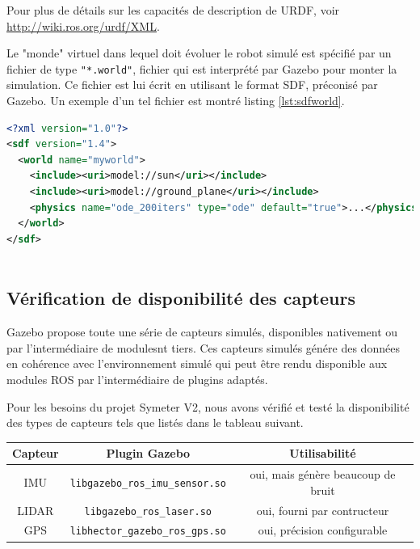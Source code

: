 \documentclass[12pt,a4paper]{report}
\begin{document}
		\para Pour plus de détails sur les capacités de description de URDF, voir  \href{http://wiki.ros.org/urdf/XML}{http://wiki.ros.org/urdf/XML}.
		
		\para Le "monde" virtuel dans lequel doit évoluer le robot simulé est spécifié par un fichier de type \verb|"*.world"|, fichier qui est interprété par Gazebo pour monter la simulation. Ce fichier est lui écrit en utilisant le format SDF, préconisé par Gazebo. Un exemple d'un tel fichier est montré listing \ref{lst:sdfworld}. 
		
		\begin{lstlisting}[caption={Exemple d'un fichier "*.world"},label={lst:sdfworld},language=XML,captionpos=b,basicstyle=\footnotesize]
<?xml version="1.0"?>
<sdf version="1.4">
  <world name="myworld">
    <include><uri>model://sun</uri></include>		
    <include><uri>model://ground_plane</uri></include>		
    <physics name="ode_200iters" type="ode" default="true">...</physics>
  </world>
</sdf>
		
		\end{lstlisting}
		
		
		
		
		\subsection{Vérification de disponibilité des capteurs}
		
		Gazebo propose toute une série de capteurs simulés, disponibles nativement ou par l'intermédiaire de modulesnt tiers. Ces capteurs simulés génére des données en cohérence avec l'environnement simulé qui peut être rendu disponible aux modules ROS par l'intermédiaire de plugins adaptés.
		
		\para Pour les besoins du projet Symeter V2, nous avons vérifié et testé la disponibilité des types de capteurs tels que listés dans le tableau suivant.
		\newline
		
		\begin{center}
			
		\begin{tabular}{|c|c|c|}
			\hline 
			Capteur & Plugin Gazebo & Utilisabilité \\ 
			\hline 
			IMU & \verb|libgazebo_ros_imu_sensor.so| &  oui, mais génère beaucoup de bruit\\ 
			\hline 
			LIDAR & \verb|libgazebo_ros_laser.so|  & oui, fourni par contructeur \\ 
			\hline 
			GPS & \verb|libhector_gazebo_ros_gps.so| & oui, précision configurable \\ 
			\hline 
		\end{tabular} 
		\end{center}
	
\end{document}
